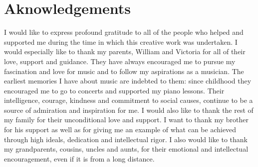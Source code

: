 \chapter*{Aknowledgements}

I would like to express profound gratitude to all of the people who helped and supported me during the time in which this creative work was undertaken. I would especially like to thank my parents, William and Victoria for all of their love, support and guidance. They have always encouraged me to pursue my fascination and love for music and to follow my aspirations as a musician. The earliest memories I have about music are indebted to them: since childhood they encouraged me to go to concerts and supported my piano lessons. Their intelligence, courage, kindness and commitment to social causes, continue to be a source of admiration and inspiration for me. I would also like to thank the rest of my family for their unconditional love and support. I want to thank my brother for his support as well as for giving me an example of what can be achieved through high ideals, dedication and intellectual rigor. I also would like to thank my grandparents, cousins, uncles and aunts, for their emotional and intellectual encouragement, even if it is from a long distance.



%








